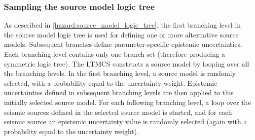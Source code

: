 \subsubsection{Sampling the source model logic tree}
As described in \ref{hazard:source_model_logic_tree}, the first branching 
level in the source model logic tree is used for defining one or more 
alternative source models. Subsequent branches define parameter-specific 
epistemic uncertainties. Each branching level contains only one branch set 
(therefore producing a symmetric logic tree). The LTMCS constructs a source 
model by looping over all the branching levels. In the first branching level, 
a source model is randomly selected, with a probability equal to the 
uncertainty weight. Epistemic uncertainties defined in subsequent branching 
levels are then applied to this initially selected source model. For each 
following branching level, a loop over the seismic sources defined in the 
selected source model is started, and for each seismic source an epistemic 
uncertainty value is randomly selected (again with a probability equal to 
the uncertainty weight).